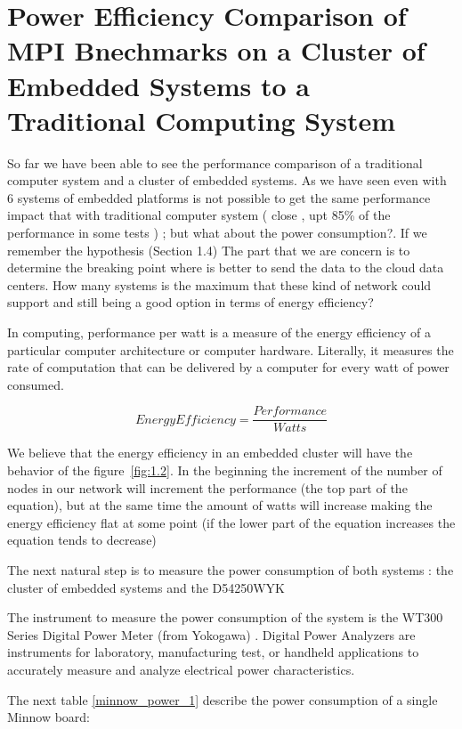 \section{Power Efficiency Comparison of MPI Bnechmarks on a Cluster of Embedded
Systems to a Traditional Computing System}

So far we have been able to see the performance comparison of a traditional
computer system and a cluster of embedded systems. As we have seen even with 6
systems of embedded platforms is not possible to get the same performance
impact that with traditional computer system ( close , upt 85\% of the
performance in some tests ) ; but what about the power consumption?. If we
remember the hypothesis (Section 1.4) The part that we are concern is to
determine the breaking point where is better to send the data to the cloud data
centers. How many systems is the maximum that these kind of network could
support and still being a good option in terms of energy efficiency?

In computing, performance per watt is a measure of the energy efficiency of a
particular computer architecture or computer hardware. Literally, it measures
the rate of computation that can be delivered by a computer for every watt of
power consumed.

\begin{equation}
    Energy Efficiency = \dfrac {Performance}{Watts}
\end{equation}

We believe that the energy efficiency in an embedded cluster will have the
behavior of the  figure~\ref{fig:1.2}. In the beginning the increment of the
number of nodes in our network will increment the performance (the top part of
the equation), but at the same time the amount of watts will
increase making the energy efficiency flat at some point (if the lower part of
the equation increases the equation tends to decrease)

The next natural step is to measure the power consumption of both systems : the
cluster of embedded systems and the D54250WYK

The instrument to measure the power consumption of the system is the WT300
Series Digital Power Meter (from Yokogawa) . Digital Power Analyzers are
instruments for laboratory, manufacturing test, or handheld applications to
accurately measure and analyze electrical power characteristics.

The next table \ref{minnow_power_1} describe the power consumption of a single Minnow board: 

